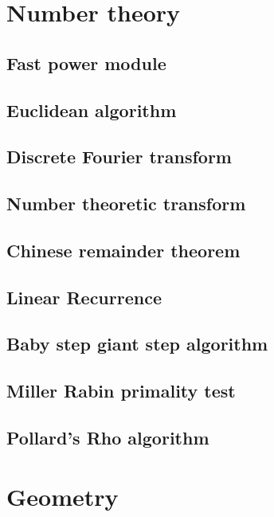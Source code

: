 \documentclass[titlepage, a4paper,10pt]{article}
\begin{document}
\begin{multicols}{2}
\begin{spacing}{0.6}
		\section{Number theory}
			\subsection{Fast power module}
				
			\subsection{Euclidean algorithm}
				
			\subsection{Discrete Fourier transform}
				
			\subsection{Number theoretic transform}
				
			\subsection{Chinese remainder theorem}
				
			\subsection{Linear Recurrence}
				
			\subsection{Baby step giant step algorithm}
				
			\subsection{Miller Rabin primality test}
				
			\subsection{Pollard's Rho algorithm}
				
		\section{Geometry}
				

\end{spacing}
\end{multicols}
\end{document}
